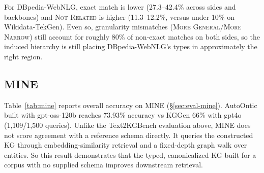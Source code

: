 \documentclass[11pt]{article}
\begin{document}
For DBpedia-WebNLG, exact match is lower (27.3--42.4\% across sides and backbones) and \textsc{Not Related} is
higher (11.3--12.2\%, versus under 10\% on Wikidata-TekGen). Even so, granularity mismatches (\textsc{More General}/\textsc{More Narrow})
still account for roughly 80\% of non-exact matches on both sides, so the
induced hierarchy is still placing DBpedia-WebNLG's types in
approximately the right region.





\subsection{MINE}
\label{sec:results-mine}

Table~\ref{tab:mine} reports overall accuracy on MINE (\S\ref{sec:eval-mine}). AutoOntic built with gpt-oss-120b reaches 73.93\% accuracy vs KGGen 66\% with gpt4o (1{,}109/1{,}500 queries). Unlike the Text2KGBench evaluation above, MINE does not score agreement with a reference schema directly. It queries the constructed KG through embedding-similarity retrieval and a fixed-depth graph walk over entities. So this result demonstrates that the typed, canonicalized KG built for a corpus with no supplied schema improves downstream retrieval.
\end{document}
